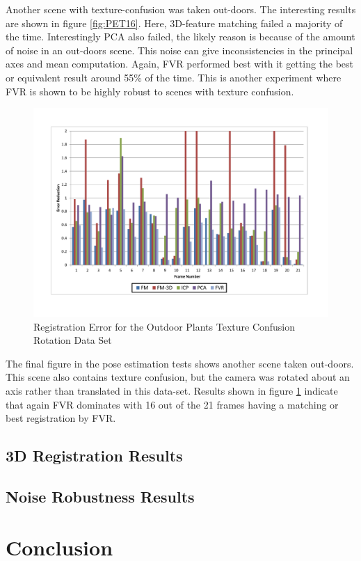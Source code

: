 Another scene with texture-confusion was taken out-doors. The interesting results are shown in figure \ref{fig:PET16}. Here, 3D-feature matching failed a majority of the time. Interestingly PCA also failed, the likely reason is because of the amount of noise in an out-doors scene. This noise can give inconsistencies in the principal axes and mean computation. Again, FVR performed best with it getting the best or equivalent result around 55\% of the time. This is another experiment where FVR is shown to be highly robust to scenes with texture confusion. 

\begin{figure}[t]
\centering
\includegraphics[width=6.0in]{images/results/Plants_Outdoors_Texture_Confusion_Rotation}
\caption{Registration Error for the Outdoor Plants Texture Confusion Rotation Data Set}
\label{fig:PET17}
\end{figure}

The final figure in the pose estimation tests shows another scene taken out-doors. This scene also contains texture confusion, but the camera was rotated about an axis rather than translated in this data-set. Results shown in figure \ref{fig:PET17} indicate that again FVR dominates with 16 out of the 21 frames having a matching or best registration by FVR. 

\subsection{3D Registration Results}



\subsection{Noise Robustness Results}



\section{Conclusion}
